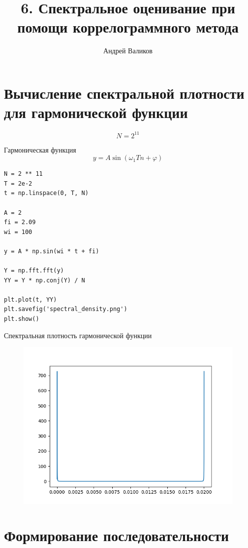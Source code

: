 \documentclass[12pt]{article}
\begin{document}
\title{6. Спектральное оценивание при помощи коррелограммного метода}
\author{Андрей Валиков}
\date{}
\maketitle
																																																								\section{Вычисление спектральной плотности для гармонической функции}
																																																	
\[N = 2^{11}\]  

Гармоническая функция
\[y=A\sin(\omega_{1}Tn + \varphi)\]
	

\begin{lstlisting}
N = 2 ** 11
T = 2e-2
t = np.linspace(0, T, N)

A = 2
fi = 2.09
wi = 100

y = A * np.sin(wi * t + fi)

Y = np.fft.fft(y)
YY = Y * np.conj(Y) / N

plt.plot(t, YY)
plt.savefig('spectral_density.png')
plt.show()
\end{lstlisting}

Спектральная плотность гармонической функции
\begin{figure}[!htb]
\centering
\includegraphics[scale=1.00]{spectral_density.png}
\caption{}
\label{}
\end{figure}


\section{Формирование последовательности}
\end{document}
